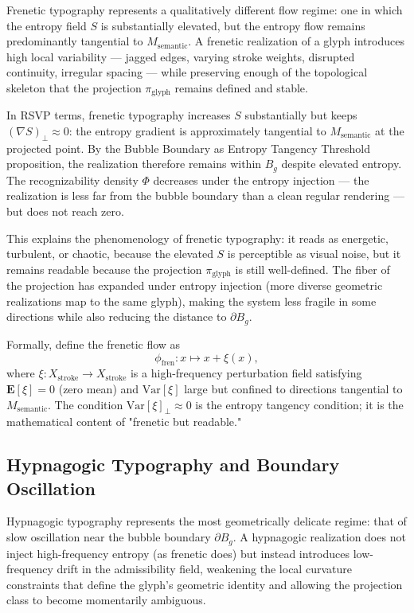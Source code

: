 \documentclass[12pt, a4paper]{article}
\theoremstyle{essaystyle}
\begin{document}
Frenetic typography represents a qualitatively different flow regime: one in which
the entropy field $S$ is substantially elevated, but the entropy flow remains
predominantly tangential to $M_{\mathrm{semantic}}$. A frenetic realization of a glyph
introduces high local variability --- jagged edges, varying stroke weights, disrupted
continuity, irregular spacing --- while preserving enough of the topological skeleton
that the projection $\pi_{\mathrm{glyph}}$ remains defined and stable.

In RSVP terms, frenetic typography increases $S$ substantially but keeps
$(\nabla S)_\perp \approx 0$: the entropy gradient is approximately tangential to
$M_{\mathrm{semantic}}$ at the projected point. By the Bubble Boundary as Entropy
Tangency Threshold proposition, the realization therefore remains within $B_g$ despite
elevated entropy. The recognizability density $\Phi$ decreases under the entropy
injection --- the realization is less far from the bubble boundary than a clean regular
rendering --- but does not reach zero.

This explains the phenomenology of frenetic typography: it reads as energetic,
turbulent, or chaotic, because the elevated $S$ is perceptible as visual noise, but it
remains readable because the projection $\pi_{\mathrm{glyph}}$ is still well-defined.
The fiber of the projection has expanded under entropy injection (more diverse
geometric realizations map to the same glyph), making the system less fragile in
some directions while also reducing the distance to $\partial B_g$.

Formally, define the frenetic flow as
\[
\phi_{\mathrm{fren}} : x \mapsto x + \xi(x),
\]
where $\xi : X_{\mathrm{stroke}} \to X_{\mathrm{stroke}}$ is a high-frequency
perturbation field satisfying $\mathbf{E}[\xi] = 0$ (zero mean) and
$\mathrm{Var}[\xi]$ large but confined to directions tangential to $M_{\mathrm{semantic}}$.
The condition $\mathrm{Var}[\xi]_\perp \approx 0$ is the entropy tangency condition;
it is the mathematical content of "frenetic but readable."

\subsection{Hypnagogic Typography and Boundary Oscillation}

Hypnagogic typography represents the most geometrically delicate regime: that of
slow oscillation near the bubble boundary $\partial B_g$. A hypnagogic realization
does not inject high-frequency entropy (as frenetic does) but instead introduces
low-frequency drift in the admissibility field, weakening the local curvature constraints
that define the glyph's geometric identity and allowing the projection class to become
momentarily ambiguous.
\end{document}
